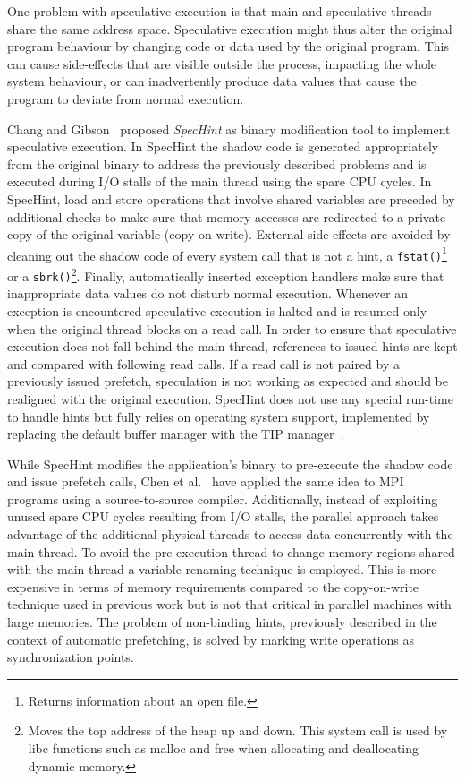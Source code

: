 One problem with speculative execution is that main and speculative threads share the same address space. Speculative execution might thus alter the original program behaviour by changing code or data used by the original program. 
This can cause side-effects that are visible outside the process, impacting the whole system behaviour, or can inadvertently produce data values that cause the program to deviate from normal execution.

Chang and Gibson~\cite{ChangG99} proposed \textit{SpecHint} as binary modification tool to implement speculative execution. In SpecHint the shadow code is generated appropriately from the original binary to address the previously 
described problems and is executed during I/O stalls of the main thread using the spare CPU cycles. In SpecHint, load and store operations that involve shared variables are preceded by additional checks to make sure that memory 
accesses are redirected to a private copy of the original variable (copy-on-write). External side-effects are avoided by cleaning out the shadow code of every system call that is not a hint, a \texttt{fstat()}\footnote{Returns
information about an open file.} or a \texttt{sbrk()}\footnote{Moves the top address of the heap up and down. This system call is used by libc functions such as malloc and free when allocating and deallocating dynamic memory.}.
Finally, automatically inserted exception handlers make sure that inappropriate data values do not disturb normal execution. Whenever an exception is encountered speculative execution is halted and is resumed only when the original 
thread blocks on a read call. In order to ensure that speculative execution does not fall behind the main thread, references to issued hints are kept and compared with following read calls. If a read call is not paired by a 
previously issued prefetch, speculation is not working as expected and should be realigned with the original execution. SpecHint does not use any special run-time to handle hints but fully relies on operating system support, 
implemented by replacing the default buffer manager with the TIP manager~\cite{Patterson1995}.

While SpecHint modifies the application's binary to pre-execute the shadow code and issue prefetch calls, Chen et al.~\cite{ChenBSTG08} have applied the same idea to MPI programs using a source-to-source compiler. Additionally,
instead of exploiting unused spare CPU cycles resulting from I/O stalls, the parallel approach takes advantage of the additional physical threads to access data concurrently with the main thread. To avoid the pre-execution thread 
to change memory regions shared with the main thread a variable renaming technique is employed. This is more expensive in terms of memory requirements compared to the copy-on-write technique used in previous work but is not that 
critical in parallel machines with large memories. The problem of non-binding hints, previously described in the context of automatic prefetching, is solved by marking write operations as synchronization points.


